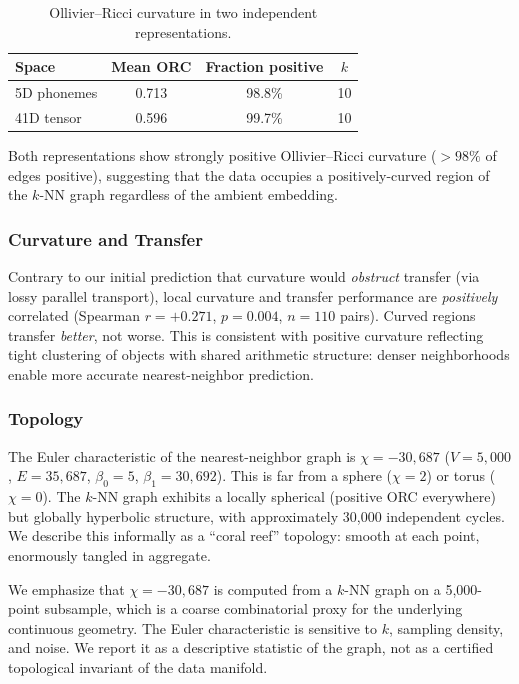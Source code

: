 \documentclass[11pt,a4paper]{article}
\begin{document}
\begin{table}[h]
\centering
\caption{Ollivier--Ricci curvature in two independent representations.}
\label{tab:curvature}
\begin{tabular}{lccc}
\toprule
Space & Mean ORC & Fraction positive & $k$ \\
\midrule
5D phonemes & 0.713 & 98.8\% & 10 \\
41D tensor & 0.596 & 99.7\% & 10 \\
\bottomrule
\end{tabular}
\end{table}

Both representations show strongly positive Ollivier--Ricci curvature ($> 98\%$ of edges positive), suggesting that the data occupies a positively-curved region of the $k$-NN graph regardless of the ambient embedding.

\subsubsection{Curvature and Transfer}

Contrary to our initial prediction that curvature would \emph{obstruct} transfer (via lossy parallel transport), local curvature and transfer performance are \emph{positively} correlated (Spearman $r = +0.271$, $p = 0.004$, $n = 110$ pairs). Curved regions transfer \emph{better}, not worse. This is consistent with positive curvature reflecting tight clustering of objects with shared arithmetic structure: denser neighborhoods enable more accurate nearest-neighbor prediction.

\subsubsection{Topology}

The Euler characteristic of the nearest-neighbor graph is $\chi = -30{,}687$ ($V = 5{,}000$, $E = 35{,}687$, $\beta_0 = 5$, $\beta_1 = 30{,}692$). This is far from a sphere ($\chi = 2$) or torus ($\chi = 0$). The $k$-NN graph exhibits a locally spherical (positive ORC everywhere) but globally hyperbolic structure, with approximately 30,000 independent cycles. We describe this informally as a ``coral reef'' topology: smooth at each point, enormously tangled in aggregate.

We emphasize that $\chi = -30{,}687$ is computed from a $k$-NN graph on a 5,000-point subsample, which is a coarse combinatorial proxy for the underlying continuous geometry. The Euler characteristic is sensitive to $k$, sampling density, and noise. We report it as a descriptive statistic of the graph, not as a certified topological invariant of the data manifold.
\end{document}
